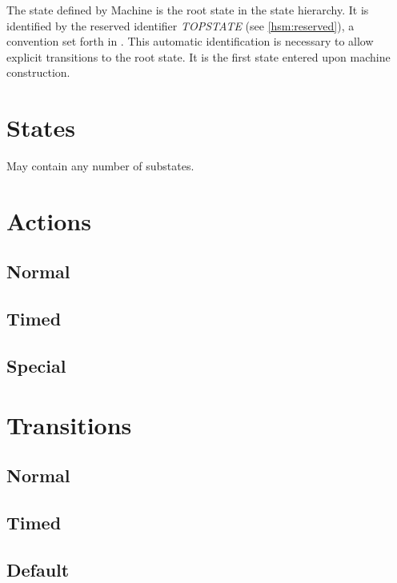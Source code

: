 \documentclass[titlepage,letterpaper]{report}
\begin{document}
The state defined by Machine is the root state
in the state hierarchy. It is identified by the reserved identifier \emph{TOPSTATE} (see \ref{hsm:reserved}),
a convention set forth in \cite{samek:psc}.
This automatic identification is necessary to allow explicit transitions to the root state.
It is the first state entered upon machine construction.

\section{States}

\label{hsm:states}

May contain any number of substates.

\section{Actions}

\label{hsm:actions}

\subsection{Normal}

\subsection{Timed}

\label{hsm:actionstimed}

\subsection{Special}

\section{Transitions}

\label{hsm:transitions}

\subsection{Normal}

\subsection{Timed}

\label{hsm:transitionstimed}

\subsection{Default}
\end{document}
